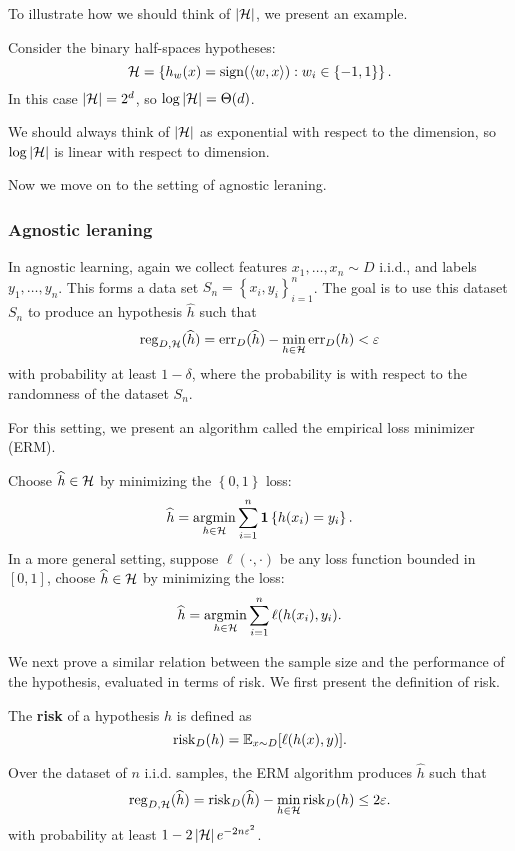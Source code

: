\documentclass[a4paper]{article}
\begin{document}
To illustrate how we should think of $\left\lvert \mathcal{H}\right\rvert$,
we present an example.
\begin{eg}
Consider the binary half-spaces hypotheses:
\[
\mathcal{H} = \left\{ h_w(x) = \operatorname{sign}(\left\langle w, x \right\rangle) :
w_i \in \left\{ -1, 1 \right\} \right\}.
\]
In this case $\left\lvert \mathcal{H}\right\rvert = 2^d$, so $\log \left\lvert \mathcal{H}\right\rvert =
\Theta(d)$.

We should always think of $\left\lvert \mathcal{H}\right\rvert$
as exponential with respect to the dimension, so
$\log \left\lvert \mathcal{H}\right\rvert$ is linear with respect to dimension.
\end{eg}

Now we move on to the setting of agnostic leraning.

\subsubsection{Agnostic leraning}

In agnostic learning, again we collect features $x_1, \dots,
x_n \sim D$ i.i.d., and labels $y_1, \dots, y_n$. This forms a
data set $S_n = \left\{ x_i, y_i \right\}_{i=1}^n$. The
goal is to use this dataset $S_n$ to produce an hypothesis
$\hat{h}$ such that
\[
\operatorname{reg}_{D, \mathcal{H}} (\widehat{h}) =
\operatorname{err}_D (\widehat{h}) - \min_{h \in \mathcal{H}} \operatorname{err}_D (h) < \varepsilon
\]
with probability at least $1 - \delta$, where the probability
is with respect to the randomness of the dataset $S_n$.

For this setting, we present an algorithm called the empirical
loss minimizer (ERM).
\begin{algorithm}
  Choose $\widehat{h} \in \mathcal{H}$ by minimizing the $\left\{ 0,1
   \right\}$ loss:
  \[
  \widehat{h} = \operatorname*{argmin}_{h \in \mathcal{H}} \sum_{i=1}^n \mathbf{1} \left\{
    h(x_i) = y_i
   \right\}.
  \]
  In a more general setting, suppose $\ell(\cdot, \cdot)$
  be any loss function bounded in $[0, 1]$, choose
  $\widehat{h} \in \mathcal{H}$ by minimizing the loss:
  \[
  \widehat{h} = \operatorname*{argmin}_{h \in \mathcal{H}} \sum_{i=1}^n \ell(h(x_i),
  y_i).
  \]
\end{algorithm}

We next prove a similar relation between the sample
size and the performance of the hypothesis, evaluated
in terms of risk. We first present the definition
of risk.

\begin{defi}[risk]
  The \textbf{risk} of a hypothesis $h$ is defined as
  \[
  \operatorname{risk}_D (h) = \mathbb{E}_{x \sim D} [ \ell(h(x), y) ].
  \]
\end{defi}

\begin{thm}
  Over the dataset of $n$ i.i.d. samples, the ERM algorithm
  produces $\hat{h}$ such that
  \[
  \operatorname{reg}_{D, \mathcal{H}} (\widehat{h})
  = \operatorname{risk}_D (\widehat{h}) - \min_{h \in \mathcal{H}}
  \operatorname{risk}_D (h)
  \leq 2 \varepsilon.
  \]
  with probability at least $1 - 2 \left\lvert \mathcal{H}\right\rvert e^{- 2
  n \varepsilon^2}$.
\end{thm}
\end{document}
